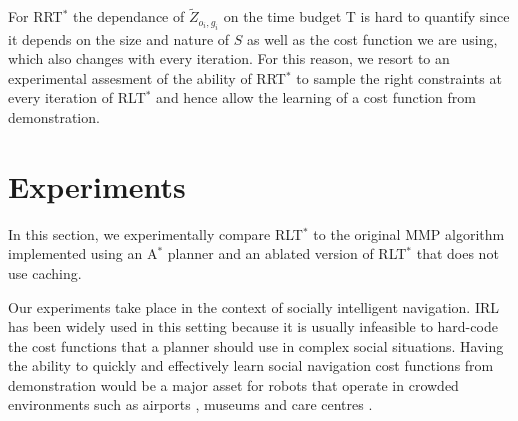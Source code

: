 \documentclass{article}  %
\begin{document}



For RRT$^*$ the dependance of $\tilde{Z}_{o_i,g_i}$ on the time budget T is hard to quantify since it depends on the size and nature of $S$ as well as the cost function we are using, which also changes with every iteration. For this reason, we resort to an experimental assesment of the ability of RRT$^*$ to sample the right constraints at every iteration of RLT$^*$ and hence allow the learning of a cost function from demonstration.

\section{Experiments}

In this section, we experimentally compare RLT$^*$ to the original MMP algorithm implemented using an A$^*$ planner and an ablated version of RLT$^*$ that does not use caching.
	
	Our experiments take place in the context of socially intelligent navigation. IRL has been widely used in this setting \cite{okallearning,henry2010learning,vasquez2014inverse} because it is usually infeasible to hard-code the cost functions that a planner should use in complex social situations. Having the ability to quickly and effectively learn social navigation cost functions from demonstration would be a major asset for robots that operate in crowded environments such as airports \cite{triebel2015spencer}, museums \cite{thrun1999minerva} and care centres \cite{shiarlis2015teresa}.
	
\end{document}
